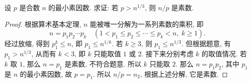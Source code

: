 \documentclass[a4paper,fleqn]{article}
\begin{document}
\begin{exmp}
    设 $p$ 是合数 $n$ 的最小素因数. 求证: 若 $p>n^{1/3}$, 则 $n/p$ 是素数.
    \begin{proof}
        根据算术基本定理, $n$ 能被唯一分解为一系列素数的乘积, 即
        \[
            n=p_1p_2\cdots p_k\quad(1<p_1\leq p_2\leq\cdots\leq p_k<n,\;k\geq1).
        \]
        经过放缩, 得到 $p_1^k\leq n$, 即 $p_1\leq n^{1/k}$. 若 $k\geq3$, 则 $p_1\leq n^{1/3}$. 但根据题意, 有 $p_1>n^{1/3}$,
        从而有 $k<3$, 即 $k$ 只能取值 $1$ 或 $2$. 接下来分别考虑 $k$ 的取值情况. 若 $k$ 取 $1$, 那么 $n=p_1$ 是素数, 不符合题意.
        所以 $k$ 只能取 $2$. 那么 $n=p_1p_2$, 其中 $p_1$ 是 $n$ 的最小素因数, 故 $p=p_1$. 所以 $n/p=n_2$, 根据上述分解, 它是素数.
    \end{proof}
\end{exmp}
\end{document}
